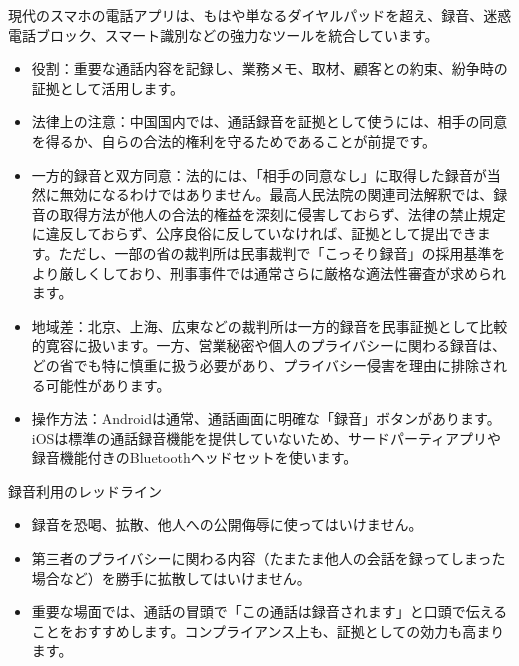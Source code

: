 


現代のスマホの電話アプリは、もはや単なるダイヤルパッドを超え、録音、迷惑電話ブロック、スマート識別などの強力なツールを統合しています。


\begin{itemize}
  \item 役割：重要な通話内容を記録し、業務メモ、取材、顧客との約束、紛争時の証拠として活用します。
  \item 法律上の注意：中国国内では、通話録音を証拠として使うには、相手の同意を得るか、自らの合法的権利を守るためであることが前提です。
  \item 一方的録音と双方同意：法的には、「相手の同意なし」に取得した録音が当然に無効になるわけではありません。最高人民法院の関連司法解釈では、録音の取得方法が他人の合法的権益を深刻に侵害しておらず、法律の禁止規定に違反しておらず、公序良俗に反していなければ、証拠として提出できます。ただし、一部の省の裁判所は民事裁判で「こっそり録音」の採用基準をより厳しくしており、刑事事件では通常さらに厳格な適法性審査が求められます。
  \item 地域差：北京、上海、広東などの裁判所は一方的録音を民事証拠として比較的寛容に扱います。一方、営業秘密や個人のプライバシーに関わる録音は、どの省でも特に慎重に扱う必要があり、プライバシー侵害を理由に排除される可能性があります。
  \item 操作方法：Androidは通常、通話画面に明確な「録音」ボタンがあります。iOSは標準の通話録音機能を提供していないため、サードパーティアプリや録音機能付きのBluetoothヘッドセットを使います。
\end{itemize}

\begin{tcbwarn}{録音利用のレッドライン}
\begin{itemize}
  \item 録音を恐喝、拡散、他人への公開侮辱に使ってはいけません。
  \item 第三者のプライバシーに関わる内容（たまたま他人の会話を録ってしまった場合など）を勝手に拡散してはいけません。
  \item 重要な場面では、通話の冒頭で「この通話は録音されます」と口頭で伝えることをおすすめします。コンプライアンス上も、証拠としての効力も高まります。
\end{itemize}

\end{tcbwarn}

